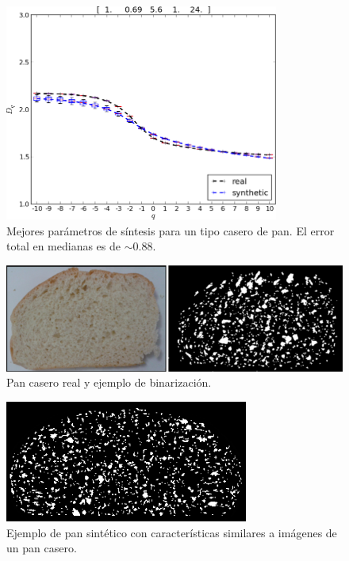 \begin{figure}[!ht]
\includegraphics[width=9cm]{figures/bestboxplot2}
\caption[Mejores parámetros de síntesis para un tipo casero de pan]{Mejores parámetros de síntesis para un tipo casero de pan. El error total en medianas es de $\sim 0.88$.}
\label{bestboxplot2}
\end{figure}

\begin{figure}[!ht]
\begin{center}
\includegraphics[width=13cm]{figures/realbin2}
\caption{ Pan casero real y ejemplo de binarización.}
\label{realbin2}
\end{center}
\end{figure}

\begin{figure}[!ht]
\begin{center}
\includegraphics[width=8cm]{figures/best2}
\caption{Ejemplo de pan sintético con características similares a imágenes de un pan casero.}
\label{best2}
\end{center}
\end{figure}

